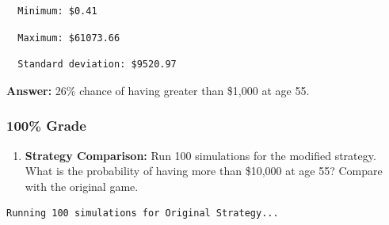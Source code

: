 \documentclass[
  letterpaper,
  DIV=11,
  numbers=noendperiod]{scrartcl}
\newenvironment{Shaded}{\begin{snugshade}}{\end{snugshade}}
\newcommand{\AttributeTok}[1]{\textcolor[rgb]{0.40,0.45,0.13}{#1}}
\newcommand{\DecValTok}[1]{\textcolor[rgb]{0.68,0.00,0.00}{#1}}
\newcommand{\FunctionTok}[1]{\textcolor[rgb]{0.28,0.35,0.67}{#1}}
\newcommand{\NormalTok}[1]{\textcolor[rgb]{0.00,0.23,0.31}{#1}}
\newcommand{\SpecialCharTok}[1]{\textcolor[rgb]{0.37,0.37,0.37}{#1}}
\newcommand{\StringTok}[1]{\textcolor[rgb]{0.13,0.47,0.30}{#1}}
\providecommand{\tightlist}{%
  \setlength{\itemsep}{0pt}\setlength{\parskip}{0pt}}
\begin{document}
\begin{verbatim}
  Minimum: $0.41
\end{verbatim}

\begin{Shaded}
\end{Shaded}

\begin{verbatim}
  Maximum: $61073.66
\end{verbatim}

\begin{Shaded}
\end{Shaded}

\begin{verbatim}
  Standard deviation: $9520.97
\end{verbatim}

\textbf{Answer:} 26\% chance of having greater than \$1,000 at age 55.

\subsubsection{100\% Grade}\label{grade-3}

\begin{enumerate}
\def\labelenumi{\arabic{enumi}.}
\setcounter{enumi}{5}
\tightlist
\item
  \textbf{Strategy Comparison:} Run 100 simulations for the modified
  strategy. What is the probability of having more than \$10,000 at age
  55? Compare with the original game.
\end{enumerate}

\begin{verbatim}
Running 100 simulations for Original Strategy...
\end{verbatim}
\end{document}
